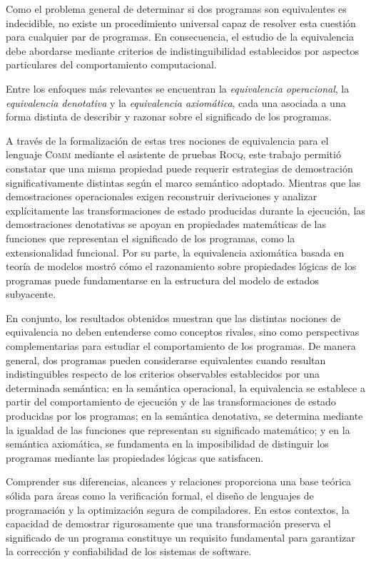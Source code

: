 Como el problema general de determinar si dos programas son equivalentes es indecidible, no existe un procedimiento universal capaz de resolver esta cuestión para cualquier par de programas. En consecuencia, el estudio de la equivalencia debe abordarse mediante criterios de indistinguibilidad establecidos por aspectos particulares del comportamiento computacional. 

Entre los enfoques más relevantes se encuentran la \emph{equivalencia operacional}, la \emph{equivalencia denotativa} y la \emph{equivalencia axiomática}, cada una asociada a una forma distinta de describir y razonar sobre el significado de los programas.

A través de la formalización de estas tres nociones de equivalencia para el lenguaje \textsc{Comm} mediante el asistente de pruebas \textsc{Rocq}, este trabajo permitió constatar que una misma propiedad puede requerir estrategias de demostración significativamente distintas según el marco semántico adoptado. Mientras que las demostraciones operacionales exigen reconstruir derivaciones y analizar explícitamente las transformaciones de estado producidas durante la ejecución, las demostraciones denotativas se apoyan en propiedades matemáticas de las funciones que representan el significado de los programas, como la extensionalidad funcional. Por su parte, la equivalencia axiomática basada en teoría de modelos mostró cómo el razonamiento sobre propiedades lógicas de los programas puede fundamentarse en la estructura del modelo de estados subyacente.

En conjunto, los resultados obtenidos muestran que las distintas nociones de equivalencia no deben entenderse como conceptos rivales, sino como perspectivas complementarias para estudiar el comportamiento de los programas. De manera general, dos programas pueden considerarse equivalentes cuando resultan indistinguibles respecto de los criterios observables establecidos por una determinada semántica: en la semántica operacional, la equivalencia se establece a partir del comportamiento de ejecución y de las transformaciones de estado producidas por los programas; en la semántica denotativa, se determina mediante la igualdad de las funciones que representan su significado matemático; y en la semántica axiomática, se fundamenta en la imposibilidad de distinguir los programas mediante las propiedades lógicas que satisfacen.

Comprender sus diferencias, alcances y relaciones proporciona una base teórica sólida para áreas como la verificación formal, el diseño de lenguajes de programación y la optimización segura de compiladores. En estos contextos, la capacidad de demostrar rigurosamente que una transformación preserva el significado de un programa constituye un requisito fundamental para garantizar la corrección y confiabilidad de los sistemas de software.

